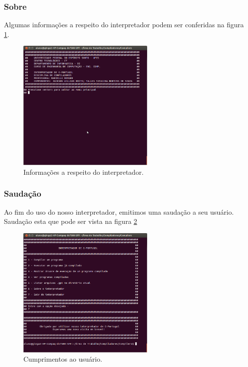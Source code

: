 \documentclass[a4paper,12pt]{report}
\begin{document}
\subsubsection{Sobre}

Algumas informa\c{c}\~oes a respeito do interpretador podem ser conferidas na figura \ref{fig:sobre}.

\begin{figure}
\centering
\includegraphics[width=0.6\textwidth]{imgs/Sobre.png}
\caption{\label{fig:sobre}Informa\c{c}\~oes a respeito do interpretador.}
\end{figure}

\subsubsection{Sauda\c{c}\~ao}

Ao fim do uso do nosso interpretador, emitimos uma sauda\c{c}\~ao a seu usu\'ario. Sauda\c{c}\~ao esta que pode ser vista na figura \ref{fig:sauda}

\begin{figure}
\centering
\includegraphics[width=0.6\textwidth]{imgs/Saudacao.png}
\caption{\label{fig:sauda}Cumprimentos ao usu\'ario.}
\end{figure}
\end{document}
